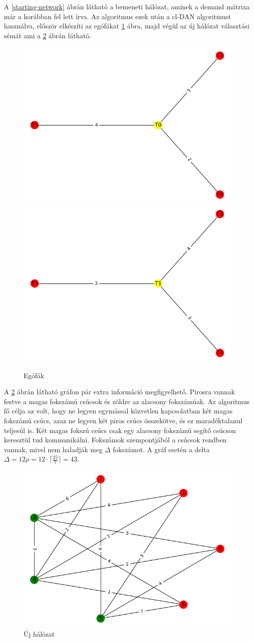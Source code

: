 \documentclass[12pt]{report}
\begin{document}
A \ref{starting-network} ábrán látható a bemeneti hálózat, aminek a demand mátrixa már a korábban fel lett írva. Az algoritmus ezek után a cl-DAN algoritmust használva, először elkészíti az egófákat \ref{ego-trees} ábra, majd végül az új hálózat választási sémát ami a \ref{routing-scheme} ábrán látható.

\begin{figure}[H]
	\begin{center}
		\includegraphics[width=0.40\linewidth]{pictures/egotree1.png}
		\includegraphics[width=0.40\linewidth]{pictures/egotree2.png}
		\caption{Egófák}
		\label{ego-trees}
	\end{center}
\end{figure}

A \ref{routing-scheme} ábrán látható gráfon pár extra információ megfigyelhető. 
Pirosra vannak festve a magas fokszámú csúcsok és zöldre az alacsony fokszámúak.
Az algoritmus fő célja az volt, hogy ne legyen egymással közvetlen kapcsolatban két magas fokszámú csúcs, azaz ne legyen két piros csúcs összekötve, és ez maradéktalanul teljesül is.
Két magas fokszú csúcs csak egy alacsony fokszámú segítő csúcson keresztül tud kommunikálni.
Fokszámok szempontjából a csúcsok rendben vannak, mivel nem haladják meg $\Delta$ fokszámot. 
A gráf esetén a delta \(\Delta = 12\rho = 12 \cdot \lceil\frac{25}{7}\rceil = 43  \).

\begin{figure}[H]
	\begin{center}
		\includegraphics[width=0.49\linewidth]{pictures/new_network.png}
		\caption{Új hálózat}
		\label{routing-scheme}
	\end{center}
\end{figure}
\end{document}
